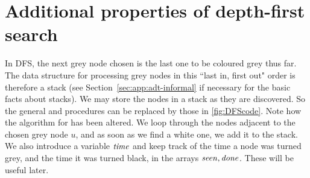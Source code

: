 \section{Additional properties of depth-first search}
\label{ss: DFS}

In DFS, the next grey node chosen is the last one to be coloured grey thus far. 
The data structure for processing grey nodes  in this ``last in, first
out" order is therefore a stack (see Section~\ref{sec:app:adt-informal} if
necessary for the basic facts about stacks). We may store the nodes in a
stack as they are discovered. So the general  and
 procedures can be replaced by those in
\cref{fig:DFScode}. Note how the algorithm for  has
been altered. We loop through the nodes adjacent to the chosen grey node
$u$, and as soon as we find a white one, we add it to the stack. We also
introduce a variable $\operatorname{\text{\textit{time}}}$ and keep track of the time a node was turned
grey, and the time it was turned black, in the arrays $\operatorname{\text{\textit{seen}}}, \operatorname{\text{\textit{done}}}$.
These will be useful later.

